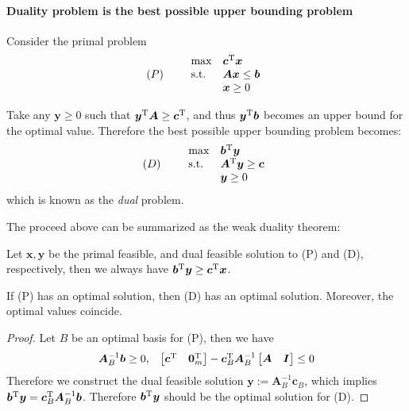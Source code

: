 \paragraph{Duality problem is the best possible upper bounding problem}
Consider the primal problem
\[
(P)\qquad
\begin{array}{ll}
\max&\bm c^{\mathrm T}\bm x\\
\text{s.t.}&\bm{Ax}\le\bm b\\
&\bm x\ge0
\end{array}
\]

Take any $\bm y\ge0$ such that $\bm y^{\mathrm T}\bm A\ge\bm c^{\mathrm T}$, and thus $\bm y^{\mathrm T}\bm b$ becomes an upper bound for the optimal value. Therefore the best possible upper bounding problem becomes:
\[
(D)\qquad
\begin{array}{ll}
\max&\bm b^{\mathrm T}\bm y\\
\text{s.t.}&\bm A^{\mathrm T}\bm y\ge\bm c\\
&\bm y\ge0
\end{array}
\]
which is known as the \emph{dual} problem.

The proceed above can be summarized as the weak duality theorem:
\begin{theorem}
Let $\bm x,\bm y$ be the primal feasible, and dual feasible solution to (P) and (D), respectively, then we always have $\bm b^{\mathrm T}\bm y\ge\bm c^{\mathrm T}\bm x$.
\end{theorem}

\begin{theorem}
If (P) has an optimal solution, then (D) has an optimal solution. Moreover, the optimal values coincide.
\end{theorem}
\begin{proof}
Let $B$ be an optimal basis for (P), then we have
\[
\begin{array}{ll}
\bm A_B^{-1}\bm b\ge0,
&
\begin{bmatrix}
\bm c^{\mathrm T}&\bm0_m^{\mathrm T}
\end{bmatrix}-\bm c_B^{\mathrm T}\bm A_B^{-1}\begin{bmatrix}
\bm A&\bm I
\end{bmatrix}\le0
\end{array}
\]
Therefore we construct the dual feasible solution $\bm y:=\bm A_B^{-1}\bm c_B$, which implies $\bm b^{\mathrm T}\bm y=\bm c_B^{\mathrm T}\bm A_B^{-1}\bm b$. Therefore $\bm b^{\mathrm T}\bm y$ should be the optimal solution for (D).
\end{proof}

